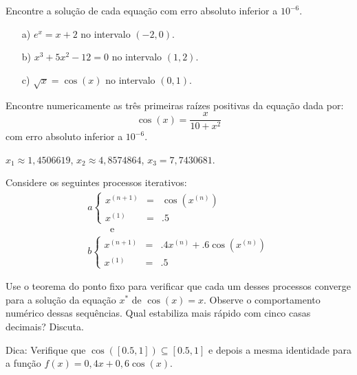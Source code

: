 \begin{ex}
\begin{exer} Encontre a solução de cada equação com erro absoluto inferior a $10^{-6}$.
  \begin{itemize}
  \item[a)] $e^x=x+2$ no intervalo $(-2,0)$.
  \item[b)] $x^3+5x^2-12=0$ no intervalo $(1,2)$.
  \item[c)] $\sqrt{x}=\cos(x)$ no intervalo $(0,1)$.
  \end{itemize}
\end{exer}

\begin{exer} Encontre numericamente as três primeiras raízes positivas da equação dada por:
  \begin{equation}
    \cos(x)=\frac{x}{10+x^2}
  \end{equation}
com erro absoluto inferior a $10^{-6}$.
\end{exer}
\begin{resp}
 $x_1\approx 1,4506619$, $x_2\approx 4,8574864$, $x_3= 7,7430681$.
\end{resp}



\begin{exer} Considere os seguintes processos iterativos:
\begin{equation}
\begin{array}{l}
a\left\{\begin{array}{rcl}
x^{(n+1)}&=&\cos(x^{(n)})\\
x^{(1)}&=&.5
\end{array}
\right. \\ \qquad \text { e }\\
b\left\{\begin{array}{rcl}
x^{(n+1)}&=&.4x^{(n)}+.6\cos(x^{(n)})\\
x^{(1)}&=&.5
\end{array}
\right.
\end{array}
\end{equation}

Use o teorema do ponto fixo para verificar que cada um desses processos converge para a solução da equação $x^*$ de $\cos(x)=x$. Observe o comportamento numérico dessas sequências. Qual estabiliza mais rápido com cinco casas decimais? Discuta.

Dica: Verifique que $\cos([0.5,1])\subseteq [0.5,1]$ e depois a mesma identidade para a função $f(x)=0,4x+0,6\cos(x)$.
\end{exer}



\end{ex}

